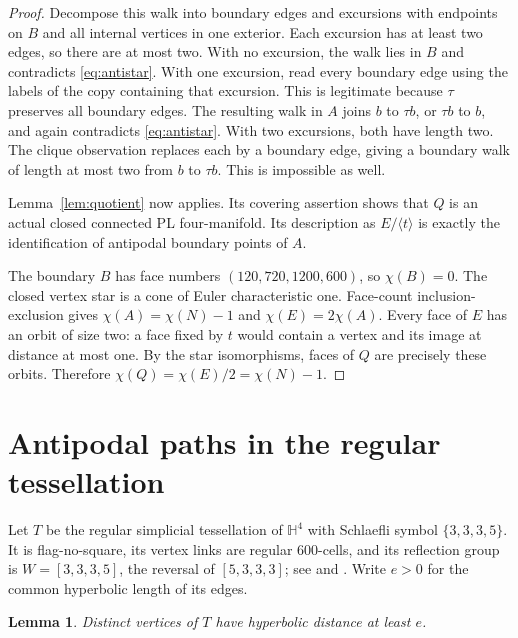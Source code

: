 \documentclass[11pt]{article}
\newtheorem{lemma}[theorem]{Lemma}
\begin{document}
\begin{proof}
Decompose this walk into boundary edges and excursions with endpoints
on $B$ and all internal vertices in one exterior. Each excursion
has at least two edges, so there are at most two.
With no excursion, the walk lies in $B$ and contradicts
\eqref{eq:antistar}.
With one excursion, read every boundary edge using the labels of
the copy containing that excursion. This is legitimate because
$\tau$ preserves all boundary edges. The resulting walk in $A$
joins $b$ to $\tau b$, or $\tau b$ to $b$, and again contradicts
\eqref{eq:antistar}.
With two excursions, both have length two. The clique observation
replaces each by a boundary edge, giving a boundary walk of length
at most two from $b$ to $\tau b$. This is impossible as well.

Lemma~\ref{lem:quotient} now applies. Its covering assertion shows
that $Q$ is an actual closed connected PL four-manifold. Its
description as $E/\langle t\rangle$ is exactly the identification
of antipodal boundary points of $A$.

The boundary $B$ has face numbers $(120,720,1200,600)$,
so $\chi(B)=0$. The closed vertex star is a cone of Euler
characteristic one. Face-count inclusion-exclusion gives
$\chi(A)=\chi(N)-1$ and $\chi(E)=2\chi(A)$.
Every face of $E$ has an orbit of size two: a face fixed by $t$
would contain a vertex and its image at distance at most one.
By the star isomorphisms, faces of $Q$ are precisely these orbits.
Therefore $\chi(Q)=\chi(E)/2=\chi(N)-1$.
\end{proof}

\section{Antipodal paths in the regular tessellation}

Let $T$ be the regular simplicial tessellation of $\mathbb H^4$
with Schlaefli symbol $\{3,3,3,5\}$. It is flag-no-square, its
vertex links are regular $600$-cells, and its reflection group is
$W=[3,3,3,5]$, the reversal of $[5,3,3,3]$; see
\cite[Remark~4.4(2)]{PS} and \cite[p.~3]{KNS}.
Write $e>0$ for the common hyperbolic length of its edges.

\begin{lemma}\label{lem:separation}
Distinct vertices of $T$ have hyperbolic distance at least $e$.
\end{lemma}
\end{document}
